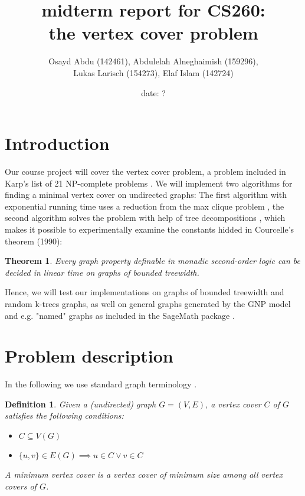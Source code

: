 \documentclass[11pt,a4paper]{article}
\title{midterm report for CS260: \\ \normalsize the vertex cover problem}
\author{Osayd Abdu (142461), Abdulelah Alneghaimish (159296), \\ Lukas Larisch (154273), Elaf Islam (142724)}
\date{date: ?}
\newtheorem*{definition}{Definition}
\newtheorem*{theorem}{Theorem}
\begin{document}
\maketitle

\section{Introduction}

Our course project will cover the vertex cover problem, a problem included in Karp's list of 21 NP-complete  problems \cite{karp, wiki}. We will implement two algorithms for finding a minimal vertex cover on undirected graphs: The first algorithm with exponential running time uses a reduction from the max clique problem \cite{Patric}, the second algorithm solves the problem with help of tree decompositions \cite{survey, graphminor, arnborg}, which makes it possible to experimentally examine the constants hidded in Courcelle's theorem (1990):

\begin{theorem}
Every graph property definable in monadic second-order logic can be decided in linear time on graphs of bounded treewidth.
\end{theorem}

Hence, we will test our implementations on graphs of bounded treewidth and random k-trees graphs, as well on general graphs generated by the GNP model and  e.g. "named" graphs as included in the SageMath package \cite{sage}.

\section{Problem description}

In the following we use standard graph terminology \cite{Diestel}.

\begin{definition}

Given a (undirected) graph $G = (V, E)$, a \emph{vertex cover} $C$ of $G$ satisfies the following conditions:

\begin{itemize}
\item $C \subseteq V(G)$ 
\item $\{u, v\} \in E(G) \implies u \in C \lor v \in C$ 
\end{itemize}

A \emph{minimum vertex cover} is a vertex cover of minimum size among all vertex covers of $G$.

\end{definition}
\end{document}
